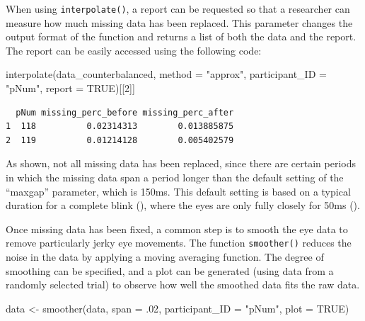 \documentclass[
  man,
  floatsintext,
  longtable,
  nolmodern,
  notxfonts,
  notimes,
  colorlinks=true,linkcolor=blue,citecolor=blue,urlcolor=blue]{apa7}
\newenvironment{Shaded}{\begin{snugshade}}{\end{snugshade}}
\newcommand{\AttributeTok}[1]{\textcolor[rgb]{0.40,0.45,0.13}{#1}}
\newcommand{\ConstantTok}[1]{\textcolor[rgb]{0.56,0.35,0.01}{#1}}
\newcommand{\DecValTok}[1]{\textcolor[rgb]{0.68,0.00,0.00}{#1}}
\newcommand{\FunctionTok}[1]{\textcolor[rgb]{0.28,0.35,0.67}{#1}}
\newcommand{\NormalTok}[1]{\textcolor[rgb]{0.00,0.23,0.31}{#1}}
\newcommand{\OtherTok}[1]{\textcolor[rgb]{0.00,0.23,0.31}{#1}}
\newcommand{\StringTok}[1]{\textcolor[rgb]{0.13,0.47,0.30}{#1}}
\begin{document}
When using \texttt{interpolate()}, a report can be requested so that a
researcher can measure how much missing data has been replaced. This
parameter changes the output format of the function and returns a list
of both the data and the report. The report can be easily accessed using
the following code:

\begin{Shaded}
\begin{Highlighting}[]
\FunctionTok{interpolate}\NormalTok{(data\_counterbalanced, }
            \AttributeTok{method =} \StringTok{"approx"}\NormalTok{,}
            \AttributeTok{participant\_ID =} \StringTok{"pNum"}\NormalTok{, }
            \AttributeTok{report =} \ConstantTok{TRUE}\NormalTok{)[[}\DecValTok{2}\NormalTok{]]}
\end{Highlighting}
\end{Shaded}

\begin{verbatim}
  pNum missing_perc_before missing_perc_after
1  118          0.02314313        0.013885875
2  119          0.01214128        0.005402579
\end{verbatim}

As shown, not all missing data has been replaced, since there are
certain periods in which the missing data span a period longer than the
default setting of the ``maxgap'' parameter, which is 150ms. This
default setting is based on a typical duration for a complete blink
(), where the eyes
are only fully closely for 50ms
().

Once missing data has been fixed, a common step is to smooth the eye
data to remove particularly jerky eye movements. The function
\texttt{smoother()} reduces the noise in the data by applying a moving
averaging function. The degree of smoothing can be specified, and a plot
can be generated (using data from a randomly selected trial) to observe
how well the smoothed data fits the raw data.

\begin{Shaded}
\begin{Highlighting}[]
\NormalTok{data }\OtherTok{\textless{}{-}} \FunctionTok{smoother}\NormalTok{(data,}
                 \AttributeTok{span =}\NormalTok{ .}\DecValTok{02}\NormalTok{,}
                 \AttributeTok{participant\_ID =} \StringTok{"pNum"}\NormalTok{, }
                 \AttributeTok{plot =} \ConstantTok{TRUE}\NormalTok{)}
\end{Highlighting}
\end{Shaded}
\end{document}
